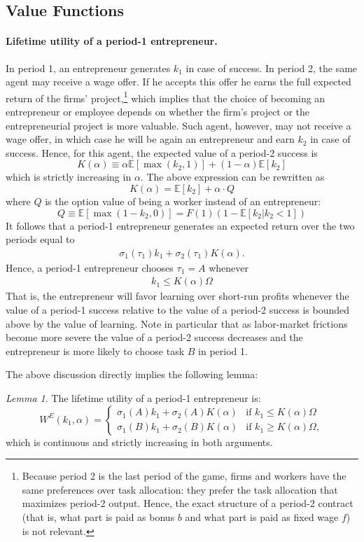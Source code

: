 \documentclass[12pt,american]{paper}
\theoremstyle{remark}
\newtheorem{lemma}{Lemma}
\newcommand{\E}[1]{\mathbb E[#1]}
\begin{document}
 
\subsection{Value Functions}
 

\paragraph{Lifetime utility of a period-1 entrepreneur.}
In period 1, an entrepreneur generates $k_1$ in case of success. In period 2, the same agent may receive a wage offer.  If he accepts this offer he earns the full expected return of the firms' project,\footnote{Because period 2 is the last period of the game, firms and workers have the same preferences over task allocation: they prefer the task allocation that maximizes period-2 output. Hence, the exact structure of a period-2 contract (that is, what part is paid as bonus $b$ and what part is paid as fixed wage $f$) is not relevant. } which implies that the choice of becoming an entrepreneur or employee depends on whether the firm's project   or the entrepreneurial project  is more valuable. Such agent, however, may not receive a wage offer, in which case  he will be again an entrepreneur and earn $k_2$ in case of success. Hence, for this agent, the expected value of a period-2 success is
\[
K(\alpha) \equiv \alpha \E{\max(k_2,1)}+(1-\alpha) \E{k_2} 
\]
which is strictly increasing in $\alpha$. The above expression can be rewritten as 
\[
K(\alpha)=\E{k_2}+\alpha \cdot Q
\]
where $Q$ is the option value of being a worker instead of an entrepreneur:
\[
Q \equiv \E{\max(1-k_2,0)}=F(1)(1-\E{k_2|k_2<1})
\]
It follows that a period-1 entrepreneur generates an expected return over the two periods equal to
\begin{align*} 
\sigma_1(\tau_1) k_1+ \sigma_2(\tau_1) K(\alpha).
\end{align*}
%
Hence, a period-1 entrepreneur chooses $\tau_1=A$ whenever
\begin{align}\label{eq: optimal entrepreneur}
k_1 \leq  K(\alpha) \Omega
\end{align}
That is, the entrepreneur will favor learning over short-run profits whenever the value of a period-1 success relative to the value of a period-2 success is bounded above by the value of learning. Note in particular that  as labor-market frictions become more severe the value of a period-2 success decreases and the entrepreneur is more likely to choose task $B$ in period 1.  

The above discussion directly implies the following lemma:
\begin{lemma}
The lifetime utility of a period-1 entrepreneur is:
\begin{equation}\label{eq: value entrepreneur}
W^E(k_1,\alpha)=\begin{cases}
\sigma_1(A) k_1+  \sigma_2(A)  K(\alpha)&\mbox{if } k_1\leq K(\alpha) \Omega \\
\sigma_1(B) k_1+  \sigma_2(B)  K(\alpha) &\mbox{if } k_1 \geq K(\alpha) \Omega, 
\end{cases}
\end{equation}
which is continuous and strictly increasing in both arguments.
\end{lemma}
\end{document}
